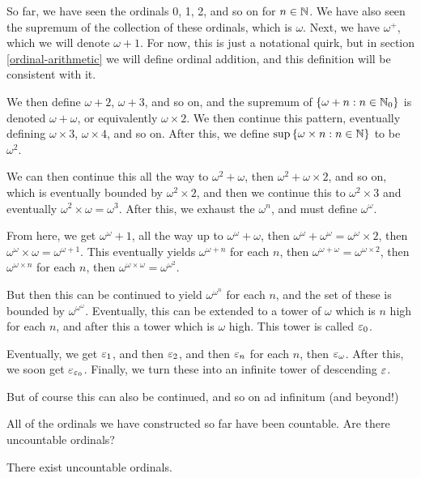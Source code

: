 \documentclass{article}
\begin{document}
So far, we have seen the ordinals 0, 1, 2, and so on for $n \in \mathbb{N}$. We have also seen the supremum of the collection of these ordinals, which is $\omega$. Next, we have $\omega^+$, which we will denote $\omega + 1$. For now, this is just a notational quirk, but in section \ref{ordinal-arithmetic} we will define ordinal addition, and this definition will be consistent with it.

We then define $\omega + 2$, $\omega + 3$, and so on, and the supremum of $\left\lbrace \omega + n: n \in \mathbb{N}_0 \right\rbrace$ is denoted $\omega + \omega$, or equivalently $\omega \times 2$. We then continue this pattern, eventually defining $\omega \times 3$, $\omega \times 4$, and so on. After this, we define $\sup \left\lbrace \omega \times n: n \in \mathbb{N} \right\rbrace$ to be $\omega^2$.

We can then continue this all the way to $\omega^2 + \omega$, then $\omega^2 + \omega \times 2$, and so on, which is eventually bounded by $\omega^2 \times 2$, and then we continue this to $\omega^2 \times 3$ and eventually $\omega^2 \times \omega = \omega^3$. After this, we exhaust the $\omega^n$, and must define $\omega^\omega$.

From here, we get $\omega^\omega + 1$, all the way up to $\omega^\omega + \omega$, then $\omega^\omega + \omega^\omega = \omega^\omega \times 2$, then $\omega^\omega \times \omega = \omega^{\omega+1}$. This eventually yields $\omega^{\omega + n}$ for each $n$, then $\omega^{\omega + \omega} = \omega^{\omega \times 2}$, then $\omega^{\omega \times n}$ for each $n$, then $\omega^{\omega \times \omega} = \omega^{\omega^2}$.

But then this can be continued to yield $\omega^{\omega^{n}}$ for each $n$, and the set of these is bounded by $\omega^{\omega^\omega}$. Eventually, this can be extended to a tower of $\omega$ which is $n$ high for each $n$, and after this a tower which is $\omega$ high. This tower is called $\varepsilon_0$.

Eventually, we get $\varepsilon_1$, and then $\varepsilon_2$, and then $\varepsilon_n$ for each $n$, then $\varepsilon_\omega$. After this, we soon get $\varepsilon_{\varepsilon_0}$. Finally, we turn these into an infinite tower of descending $\varepsilon$.

But of course this can also be continued, and so on ad infinitum (and beyond!)

All of the ordinals we have constructed so far have been countable. Are there uncountable ordinals?

\begin{theorem}
    There exist uncountable ordinals.
\end{theorem}
\end{document}
